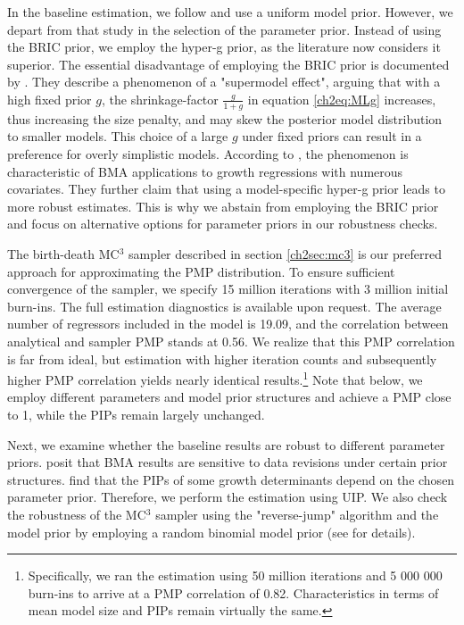 In the baseline estimation, we follow \citet{Fernandezetal2001} and use a uniform model prior. However, we depart from that study in the selection of the parameter prior. Instead of using the \ac{BRIC} prior, we employ the hyper-g prior, as the literature now considers it superior. The essential disadvantage of employing the \ac{BRIC} prior is documented by \citet{FeldkircherZeugner2012}. They describe a phenomenon of a "supermodel effect", arguing that with a high fixed prior $g$, the shrinkage-factor $\frac{g}{1+g}$ in equation \ref{ch2eq:MLg} increases, thus increasing the size penalty, and may skew the posterior model distribution to smaller models. This choice of a large $g$ under fixed priors can result in a preference for overly simplistic models. According to \citet{FeldkircherZeugner2012}, the phenomenon is characteristic of \ac{BMA} applications to growth regressions with numerous covariates. They further claim that using a model-specific hyper-g prior leads to more robust estimates. This is why we abstain from employing the \ac{BRIC} prior and focus on alternative options for parameter priors in our robustness checks.

The birth-death MC$^{3}$ sampler described in section \ref{ch2sec:mc3} is our preferred approach for approximating the \ac{PMP} distribution. To ensure sufficient convergence of the sampler, we specify 15 million iterations with 3 million  initial burn-ins. The full estimation diagnostics is available upon request. The average number of regressors included in the model is 19.09, and the correlation between analytical and sampler \ac{PMP} stands at 0.56. We realize that this \ac{PMP} correlation is far from ideal, but estimation with higher iteration counts and subsequently higher \ac{PMP} correlation yields nearly identical results.\footnote{Specifically, we ran the estimation using 50 million iterations and 5 000 000 burn-ins to arrive at a \ac{PMP} correlation of 0.82. Characteristics in terms of mean model size and \acp{PIP} remain virtually the same.} Note that below, we employ different parameters and model prior structures and achieve a \ac{PMP} close to 1, while the \acp{PIP} remain largely unchanged. 

Next, we examine whether the baseline results are robust to different parameter priors. \citet{CicconeJarocinski2010} posit that \ac{BMA} results are sensitive to data revisions under certain prior structures. \citet{Eicheretal2011} find that the \acp{PIP} of some growth determinants depend on the chosen parameter prior. Therefore, we perform the estimation using \ac{UIP}. We also check the robustness of the MC$^{3}$ sampler using the "reverse-jump" algorithm and the model prior by employing a random binomial model prior (see \citet{Zeugner2011} for details).


